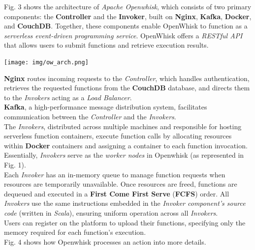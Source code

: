Fig. 3 shows the architecture of \textit{Apache Openwhisk}, which consists of two primary components: the \textbf{Controller} and the \textbf{Invoker}, built on \textbf{Nginx}, \textbf{Kafka}, \textbf{Docker}, and \textbf{CouchDB}. Together, these components enable OpenWhisk to function as a \textit{serverless event-driven programming service}. OpenWhisk offers a \textit{RESTful API} that allows users to submit functions and retrieve execution results.\vspace{10pt}
\begin{center}
    \texttt{[image: img/ow\_arch.png]}
    \vspace{10pt}
\end{center}
\textbf{Nginx} routes incoming requests to the \textit{Controller}, which handles authentication, retrieves the requested functions from the \textbf{CouchDB} database, and directs them to the \textit{Invokers} acting as a \textit{Load Balancer}.\vspace{14pt}\\
\textbf{Kafka}, a high-performance message distribution system, facilitates communication between the \textit{Controller} and the \textit{Invokers}.\vspace{14pt}\\
The \textit{Invokers}, distributed across multiple machines and responsible for hosting serverless function containers, execute function calls by allocating resources within \textbf{Docker} containers and assigning a container to each function invocation. Essentially, \textit{Invokers} serve as the \textit{worker nodes} in Openwhisk (as represented in Fig. 1).\vspace{14pt}\\
Each \textit{Invoker} has an in-memory queue to manage function requests when resources are temporarily unavailable. Once resources are freed, functions are dequeued and executed in a \textbf{First Come First Serve} (\textbf{FCFS}) order. All \textit{Invokers} use the same instructions embedded in the \textit{Invoker component's source code} (written in \textit{Scala}), ensuring uniform operation across all \textit{Invokers}.\vspace{14pt}\\
Users can register on the platform to upload their functions, specifying only the memory required for each function's execution.\cite{banaei2022etas}\vspace{14pt}\\
Fig. 4 shows how Openwhisk processes an action into more details.\cite{sciabarra2019learning}\vspace{10pt}
